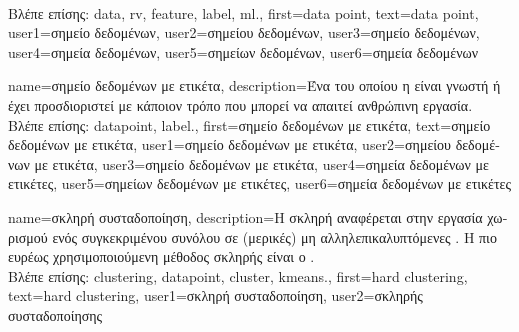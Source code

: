 {{%
		\\
		\foreignlanguage{greek}{Βλέπε επίσης:} \gls{data}, \gls{rv}, \gls{feature}, \gls{label}, \gls{ml}.}, 
	first={data point},
	text={data point},
	user1={\foreignlanguage{greek}{σημείο δεδομένων}}, %
	user2={\foreignlanguage{greek}{σημείου δεδομένων}}, %
	user3={\foreignlanguage{greek}{σημείο δεδομένων}}, %
	user4={\foreignlanguage{greek}{σημεία δεδομένων}}, %
	user5={\foreignlanguage{greek}{σημείων δεδομένων}}, %
	user6={\foreignlanguage{greek}{ση\-μεί\-α δεδομένων}} %
}

{name={\foreignlanguage{greek}{σημείο δεδομένων με ετικέτα}},
 	description={\foreignlanguage{greek}{Ένα}  
		\foreignlanguage{greek}{του οποίου η}  \foreignlanguage{greek}{είναι γνωστή ή έχει προσδιοριστεί με κάποιον 
		τρόπο που μπορεί να απαιτεί ανθρώπινη εργασία.} \\
		\foreignlanguage{greek}{Βλέπε επίσης:} \gls{datapoint}, \gls{label}.},
 	first={\foreignlanguage{greek}{σημείο δεδομένων με ετικέτα}},
 	text={\foreignlanguage{greek}{σημείο δεδομένων με ετικέτα}},
 	user1={\foreignlanguage{greek}{σημείο δεδομένων με ετικέτα}}, %
 	user2={\foreignlanguage{greek}{σημείου δεδομένων με ετικέτα}}, %
 	user3={\foreignlanguage{greek}{σημείο δεδομένων με ετικέτα}}, %
 	user4={\foreignlanguage{greek}{σημεία δεδομένων με ετικέτες}}, %
 	user5={\foreignlanguage{greek}{σημείων δεδομένων με ετικέτες}}, %
 	user6={\foreignlanguage{greek}{σημεία δεδομένων με ετικέτες}} %
}

{name={\foreignlanguage{greek}{σκληρή συσταδοποίηση}}, 
	description={\foreignlanguage{greek}{Η σκληρή} 
		\foreignlanguage{greek}{αναφέρεται στην εργασία χωρισμού ενός συγκεκριμένου συνόλου}  
		\foreignlanguage{greek}{σε (μερικές) μη αλληλεπικαλυπτόμενες} . 
		\foreignlanguage{greek}{Η πιο ευρέως χρησιμοποιούμενη μέθοδος σκληρής}  \foreignlanguage{greek}{είναι ο} 
		.\\
		\foreignlanguage{greek}{Βλέπε επίσης:} \gls{clustering}, \gls{datapoint}, \gls{cluster}, \gls{kmeans}.},
	first={hard clustering},
	text={hard clustering},
	user1={\foreignlanguage{greek}{σκληρή συσταδοποίηση}}, %
	user2={\foreignlanguage{greek}{σκληρής συσταδοποίησης}} %
}

